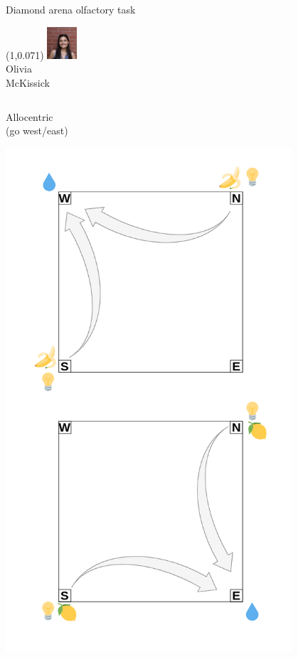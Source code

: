 \documentclass[bigger]{beamer}
\begin{document}
\begin{frame}[label={sec:orgc09b37b}]{Diamond arena olfactory task}
\addtocounter{framenumber}{-1}
\begin{textblock}{0.2}(1,0.071)%
\center%
\includegraphics[width=3em]{img/olivia.jpg}\\
\scriptsize
Olivia\\McKissick
\end{textblock}
\begin{columns}
\begin{column}[t]{0.5\columnwidth}
\center
\vspace{-2em}
Allocentric\\
(go west/east)
\vspace{-1.5em}
\begin{center}
\includegraphics[width=0.8\textwidth]{img/RL_env-allo-task.drawio.png}

\end{center}
\end{column}
\end{columns}
\end{frame}
\end{document}
